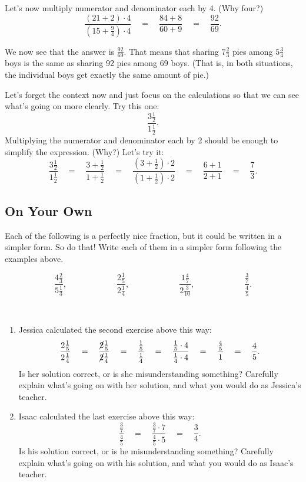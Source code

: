 Let's now multiply numerator and denominator each by 4. (Why four?)
\[
\frac{\left(21+2\right)\cdot 4}{\left(15+ \frac 94\right)\cdot 4}
\quad
=
\quad
\frac{84+8}{60+9} 
\quad
= 
\quad
\frac{92}{69}.
\]

We now see that the answer is $\frac{92}{69}$.  That means that sharing $7\frac 2 3$ 
pies among $5 \frac 3 4$ boys
 is the same as
sharing 92 pies among 69 boys.  (That is, in both situations, the individual boys get exactly the same amount of pie.)


\begin{example}
Let's forget the context now and just focus on the calculations so that we can see what's going on more clearly.  Try this one:
\[
\frac{3\frac 12}{1\frac 1 2}.
\]
Multiplying the numerator and denominator each by 2 should be enough to simplify
the expression.  (Why?)  Let's try it:
\[
\frac{3\frac 12}{1\frac 1 2}
\quad
=
\quad
\frac{3+\frac 12}{1+\frac 1 2}
\quad
=
\quad
\frac{\left(3+\frac 12\right)\cdot 2}{\left(1+\frac 1 2\right)\cdot 2}
\quad
=
\quad
\frac{6+1}{2+1} 
\quad
= 
\quad
\frac 73.
\]



\end{example}

\subsection*{On Your Own}
Each of the following is a perfectly nice fraction, but it could be written in a simpler form.  So do that!  Write each of them in a simpler form following the examples above.

\[
\frac{4\frac 2 3}{5 \frac 1 3},
\qquad\qquad\qquad
\frac{2 \frac 15}{2 \frac 14},
\qquad\qquad\qquad
\frac{1\frac 47}{2\frac 3{10}},
\qquad\qquad\qquad
\frac{\frac37}{\frac45}.
\]

\begin{thinkpair*}\ 
\begin{enumerate}
\item
Jessica calculated the second exercise above this way:
\[
\frac{2 \frac 15}{2 \frac 14} 
\quad
=
\quad
\frac{\cancel{2} \frac 15}{\cancel{2} \frac 14}
\quad
=
\quad
\frac{\frac 15}{\frac 14}
\quad
 =
 \quad
\frac{\frac 15 \cdot 4}{\frac 14\cdot 4}
\quad
 = 
 \quad
\frac{\frac 45}{1}
\quad
 =
 \quad
  \frac 45.
\]
Is her solution correct, or is she misunderstanding something?  Carefully explain what's going on with her solution, and what you would do as Jessica's teacher.\\

\item
Isaac calculated the last exercise above this way:
\[
\frac{\frac37}{\frac45}
\quad
=
\quad
\frac{\frac37\cdot 7}{\frac45 \cdot 5}
\quad
=
\quad
\frac 34.
\]
Is his solution correct, or is he misunderstanding something?  Carefully explain what's going on with his solution, and what you would do as Isaac's teacher.

\end{enumerate}

\end{thinkpair*}



